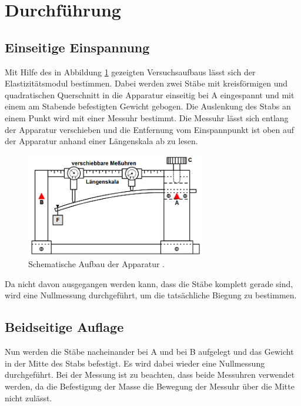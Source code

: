 \section{Durchführung}
\label{sec:Durchfuehrung}

\subsection{Einseitige Einspannung}
\label{sec:einseiteEinspannung}
Mit Hilfe des in Abbildung \ref{fig:aufbau} gezeigten Versuchsaufbaus lässt sich der Elastizitätsmodul bestimmen.
Dabei werden zwei Stäbe mit kreisförmigen und quadratischen Querschnitt in die Apparatur einseitig bei A eingespannt 
und mit einem am Stabende befestigten Gewicht gebogen.
Die Auslenkung des Stabs an einem Punkt wird mit einer Messuhr bestimmt. Die Messuhr lässt sich entlang der Apparatur
verschieben und die Entfernung vom Einspannpunkt ist oben auf der Apparatur anhand einer Längenskala ab zu lesen.

\begin{figure}
    \centering
    \includegraphics[width=0.7\textwidth]{aufbau.png}
    \caption{Schematische Aufbau der Apparatur \cite{anleitung}.}
    \label{fig:aufbau}
\end{figure}

Da nicht davon ausgegangen werden kann, dass die Stäbe komplett gerade sind, wird eine Nullmessung durchgeführt, um
die tatsächliche Biegung zu bestimmen.

\subsection{Beidseitige Auflage}
\label{sec:beidseitigeEinspannung}
Nun werden die Stäbe nacheinander bei A und bei B aufgelegt und das Gewicht in der Mitte des Stabs befestigt. Es wird dabei
wieder eine Nullmessung durchgeführt. Bei der Messung ist zu beachten, dass beide Messuhren verwendet werden, da die Befestigung
der Masse die Bewegung der Messuhr über die Mitte nicht zulässt.